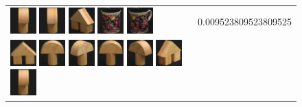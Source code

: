 \begin{figure}[!bp]
\begin{tabular}{m{11cm} | m{3cm} |}
\includegraphics[width=1cm]{coil/beeld-5.eps}
\includegraphics[width=1cm]{coil/beeld-2.eps}
\includegraphics[width=1cm]{coil/beeld-46.eps}
\includegraphics[width=1cm]{coil/beeld-62.eps}
\includegraphics[width=1cm]{coil/beeld-63.eps}
& {\scriptsize 0.009523809523809525}
\\
\includegraphics[width=1cm]{coil/beeld-42.eps}
\includegraphics[width=1cm]{coil/beeld-0.eps}
\includegraphics[width=1cm]{coil/beeld-3.eps}
\includegraphics[width=1cm]{coil/beeld-1.eps}
\includegraphics[width=1cm]{coil/beeld-4.eps}
\includegraphics[width=1cm]{coil/beeld-45.eps}
\includegraphics[width=1cm]{coil/beeld-5.eps}

\end{tabular}
\end{figure}
